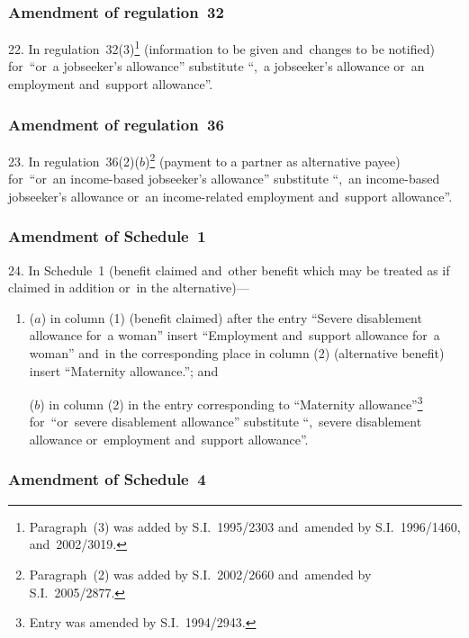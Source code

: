 \documentclass[12pt,a4paper]{article}
\begin{document}
\subsubsection[22. Amendment of regulation~32]{Amendment of regulation~32}

22.  In regulation~32(3)\footnote{Paragraph~(3) was added by S.I.~1995/2303 and~amended by S.I.~1996/1460, and~2002/3019.} (information to be given and~changes to be notified) for~“or~a jobseeker’s allowance” substitute “,~a jobseeker’s allowance or~an employment and~support allowance”.

\subsubsection[23. Amendment of regulation~36]{Amendment of regulation~36}

23.  In regulation~36(2)($b$)\footnote{Paragraph~(2) was added by S.I.~2002/2660 and~amended by S.I.~2005/2877.} (payment to a partner as alternative payee) for~“or~an income-based jobseeker’s allowance” substitute “,~an income-based jobseeker’s allowance or~an income-related employment and~support allowance”.

\subsubsection[24. Amendment of Schedule~1]{Amendment of Schedule~1}

24.  In Schedule~1 (benefit claimed and~other benefit which may be treated as if claimed in addition or~in the alternative)—
\begin{enumerate}\item[]
($a$) in column (1) (benefit claimed) after the entry “Severe disablement allowance for~a woman” insert “Employment and~support allowance for~a woman” and~in the corresponding place in column (2) (alternative benefit) insert “Maternity allowance.”; and

($b$) in column (2) in the entry corresponding to “Maternity allowance”\footnote{Entry was amended by S.I.~1994/2943.} for~“or~severe disablement allowance” substitute “,~severe disablement allowance or~employment and~support allowance”.
\end{enumerate}

\subsubsection[25. Amendment of Schedule~4]{Amendment of Schedule~4}
\end{document}
